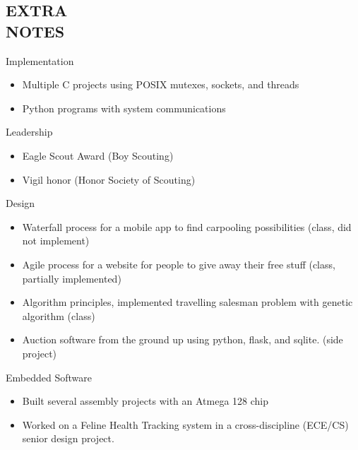 \documentclass[mm]{res}
\begin{document}
\begin{resume}
\section{EXTRA \\ NOTES}     
	Implementation
		\begin{itemize}
			\item Multiple C projects using POSIX mutexes, sockets, and threads
			\item Python programs with system communications
		\end{itemize}    
            Leadership
		\begin{itemize}
			\item Eagle Scout Award (Boy Scouting)
			\item Vigil honor (Honor Society of Scouting)
		\end{itemize}
	Design
		\begin{itemize}
			\item Waterfall process for a mobile app to find carpooling possibilities (class, did not implement)
			\item Agile process for a website for people to give away their free stuff (class, partially implemented)
			\item Algorithm principles, implemented travelling salesman problem with genetic algorithm (class)
      \item Auction software from the ground up using python, flask, and sqlite. (side project)
		\end{itemize}
	Embedded Software
		\begin{itemize}
			\item Built several assembly projects with an Atmega 128 chip
      			\item Worked on a Feline Health Tracking system in a cross-discipline (ECE/CS) senior design project.
 		\end{itemize}

\end{resume}
\end{document}
